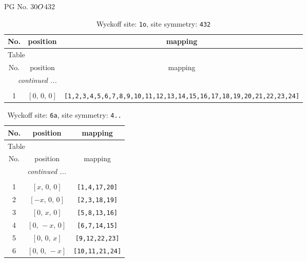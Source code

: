 \documentclass[fleqn,8pt]{jsarticle}
\begin{document}
\setcounter{MaxMatrixCols}{32}

\renewcommand{\tablename}{Table~}
\renewcommand{\figurename}{Figure~}
\begin{center}
\LARGE
PG No. 30\quad$O_{\rm }$\quad$432$\quad[ cubic ]
\end{center}
\renewcommand{\arraystretch}{1.2}
\begin{longtable}{ccc}
\caption{Wyckoff site: {\tt 1o}, site symmetry: {\tt 432}}
 \\
 \hline \hline
No. & position & mapping \\ \hline \endfirsthead

\multicolumn{2}{l}{\tablename\ \thetable{}} \\
 \hline \hline
No. & position & mapping \\ \hline \endhead

 \hline \hline
\multicolumn{2}{r}{\footnotesize\it continued ...} \\ \endfoot

 \hline \hline
\multicolumn{2}{r}{} \\ \endlastfoot

1 & $\left[ 0,\, 0,\, 0 \right]$ & {\tt [1,2,3,4,5,6,7,8,9,10,11,12,13,14,15,16,17,18,19,20,21,22,23,24]} \\
\end{longtable}
\renewcommand{\arraystretch}{1.2}
\begin{longtable}{ccc}
\caption{Wyckoff site: {\tt 6a}, site symmetry: {\tt 4..}}
 \\
 \hline \hline
No. & position & mapping \\ \hline \endfirsthead

\multicolumn{2}{l}{\tablename\ \thetable{}} \\
 \hline \hline
No. & position & mapping \\ \hline \endhead

 \hline \hline
\multicolumn{2}{r}{\footnotesize\it continued ...} \\ \endfoot

 \hline \hline
\multicolumn{2}{r}{} \\ \endlastfoot

1 & $\left[ x,\, 0,\, 0 \right]$ & {\tt [1,4,17,20]} \\ \hline
2 & $\left[ - x,\, 0,\, 0 \right]$ & {\tt [2,3,18,19]} \\ \hline
3 & $\left[ 0,\, x,\, 0 \right]$ & {\tt [5,8,13,16]} \\ \hline
4 & $\left[ 0,\, - x,\, 0 \right]$ & {\tt [6,7,14,15]} \\ \hline
5 & $\left[ 0,\, 0,\, x \right]$ & {\tt [9,12,22,23]} \\ \hline
6 & $\left[ 0,\, 0,\, - x \right]$ & {\tt [10,11,21,24]} \\
\end{longtable}
\end{document}
